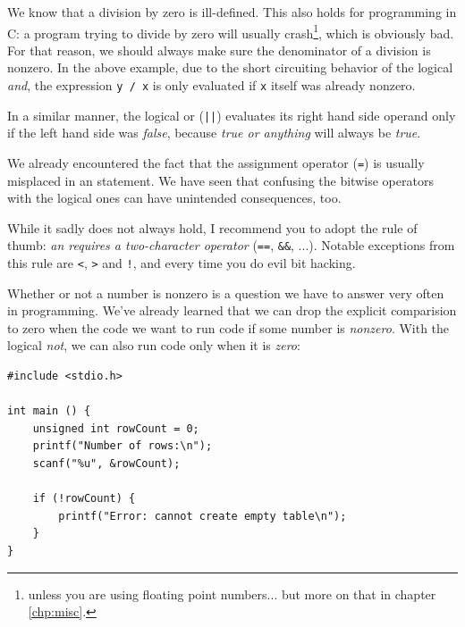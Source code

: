 We know that a division by zero is ill-defined. This also holds for programming in C: a program trying to divide by zero will usually crash\footnote{unless you are using floating point numbers... but more on that in chapter \ref{chp:misc}.}, which is obviously bad. For that reason, we should always make sure the denominator of a division is nonzero. In the above example, due to the short circuiting behavior of the logical \emph{and}, the expression \texttt{y / x} is only evaluated if \texttt{x} itself was already nonzero.

In a similar manner, the logical or (\texttt{||}) evaluates its right hand side operand only if the left hand side was \emph{false}, because \emph{true or anything} will always be \emph{true}.

\begin{hintbox}
We already encountered the fact that the assignment operator (\texttt{=}) is usually misplaced in an  statement. We have seen that confusing the bitwise operators with the logical ones can have unintended consequences, too.

While it sadly does not always hold, I recommend you to adopt the rule of thumb: \emph{an  requires a two-character operator} (\ie \texttt{==}, \texttt{\&\&}, ...). Notable exceptions from this rule are \texttt{<}, \texttt{>} and \texttt{!}, and every time you do evil bit hacking.
\end{hintbox}

\begin{hintbox}
Whether or not a number is nonzero is a question we have to answer very often in programming. We've already learned that we can drop the explicit comparision to zero when the code we want to run code if some number is \emph{nonzero}. With the logical \emph{not}, we can also run code only when it is \emph{zero}:

\vspace{6pt}
\begin{codebox}[implicitIfZero.c]
\begin{verbatim}
#include <stdio.h>

int main () {
    unsigned int rowCount = 0;
    printf("Number of rows:\n");
    scanf("%u", &rowCount);

    if (!rowCount) {
        printf("Error: cannot create empty table\n");
    }
}
\end{verbatim}
\end{codebox}
\end{hintbox}

